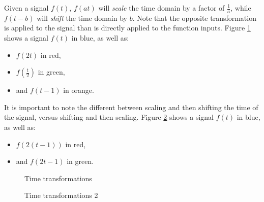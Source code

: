 Given a signal $f(t)$, $f(at)$ will \emph{scale} the time domain by a factor of $\frac{1}{a}$, while $f(t - b)$ will \emph{shift} the time domain by $b$. Note that the opposite transformation is applied to the signal than is directly applied to the function inputs. Figure \ref{fig:time-scale-shifts} shows a signal $f(t)$ in blue, as well as:
\begin{itemize}
    \item $f(2t)$ in red,
    \item $f(\frac{t}{2})$ in green,
    \item and $f(t - 1)$ in orange.
\end{itemize}

It is important to note the different between scaling and then shifting the time of the signal, versus shifting and then scaling. Figure \ref{fig:time-scale-shifts-2} shows a signal $f(t)$ in blue, as well as:
\begin{itemize}
    \item $f(2(t-1))$ in red,
    \item and $f(2t-1)$ in green.
\end{itemize}

\begin{figure}
    \centering
\caption{Time transformations}
\label{fig:time-scale-shifts}
\end{figure}

\begin{figure}
    \centering
\caption{Time transformations 2}
\label{fig:time-scale-shifts-2}
\end{figure}

